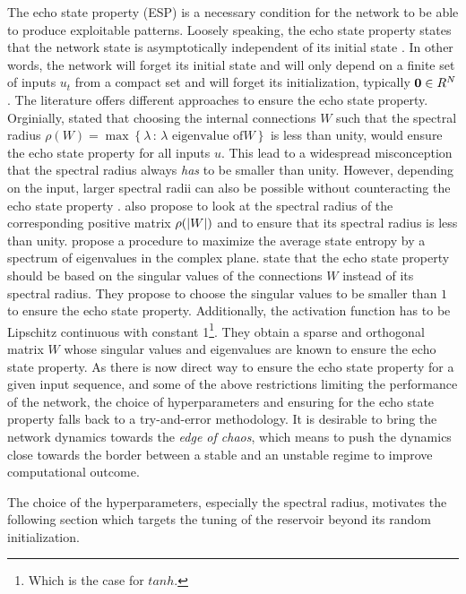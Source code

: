The echo state property (ESP) is a necessary condition for the network to be able to produce exploitable patterns. Loosely speaking, the echo state property states that the network state is asymptotically independent of its initial state \citep{Jaeger2003}. In other words, the network will forget its initial state and will only depend on a finite set of inputs $u_t$ from a compact set and will forget its initialization, typically ${\bf 0} \in R^{N}$.
The literature offers different approaches to ensure the echo state property. Orginially, \cite{Jaeger2001} stated that choosing the internal connections $W$ such that the spectral radius $\rho(W) = \max \left\{\lambda \,:\, \lambda \text{ eigenvalue of} W\right\}$ is less than unity, would ensure the echo state property for all inputs $u$. This lead to a widespread misconception that the spectral radius always \textit{has} to be smaller than unity. However, depending on the input, larger spectral radii can also be possible without counteracting the echo state property \citep{YILDIZ20121}. \cite{YILDIZ20121} also propose to look at the spectral radius of the corresponding positive matrix $\rho(\left| W \right|)$ and to ensure that its spectral radius is less than unity. \cite{Ozturk2007AnalysisDesign} propose a procedure to maximize the average state entropy by a spectrum of eigenvalues in the complex plane. \cite{Strauss2012Design} state that the echo state property should be based on the singular values of the connections $W$ instead of its spectral radius. They propose to choose the singular values to be smaller than $1$ to ensure the echo state property. Additionally, the activation function has to be Lipschitz continuous with constant 1\footnote{Which is the case for $tanh$.}. They obtain a sparse and orthogonal matrix $W$ whose singular values and eigenvalues are known to ensure the echo state property.
As there is now direct way to ensure the echo state property for a given input sequence, and some of the above restrictions limiting the performance of the network, the choice of hyperparameters and ensuring for the echo state property falls back to a try-and-error methodology. It is desirable to bring the network dynamics towards the \textit{edge of chaos}, which means to push the dynamics close towards the border between a stable and an unstable regime \citep{LengensteinMaass2007EdgeOfChaos, Buesing2010} to improve computational outcome. 

The choice of the hyperparameters, especially the spectral radius, motivates the following section which targets the tuning of the reservoir beyond its random initialization.


